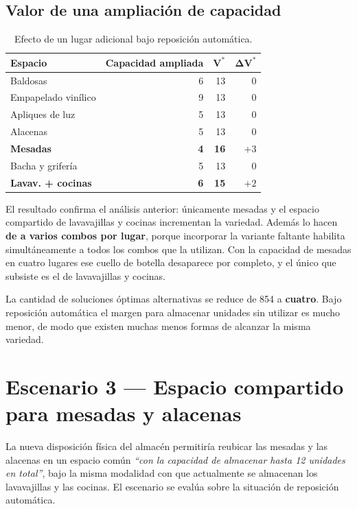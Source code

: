 \documentclass[10pt,a4paper]{article}
\newcommand{\cuello}[1]{\textbf{\textcolor{limita}{#1}}}
\newcommand{\cita}[1]{\emph{``#1''}}
\begin{document}
\subsection{Valor de una ampliación de capacidad}

\begin{table}[H]
\centering\small
\caption{Efecto de un lugar adicional bajo reposición automática.}
\label{tab:cap_e2}
\begin{tabular}{lrrr}
\toprule
\textbf{Espacio} & \textbf{Capacidad ampliada} & $\boldsymbol{V^{*}}$ & $\boldsymbol{\Delta V^{*}}$ \\
\midrule
Baldosas                  & 6 & 13 & 0 \\
Empapelado vinílico       & 9 & 13 & 0 \\
Apliques de luz           & 5 & 13 & 0 \\
Alacenas                  & 5 & 13 & 0 \\
\cuello{Mesadas}          & \cuello{4} & \cuello{16} & \cuello{$+3$} \\
Bacha y grifería          & 5 & 13 & 0 \\
\cuello{Lavav. + cocinas} & \cuello{6} & \cuello{15} & \cuello{$+2$} \\
\bottomrule
\end{tabular}
\end{table}

El resultado confirma el análisis anterior: únicamente mesadas y el espacio
compartido de lavavajillas y cocinas incrementan la variedad. Además lo hacen
\textbf{de a varios combos por lugar}, porque incorporar la variante faltante
habilita simultáneamente a todos los combos que la utilizan. Con la capacidad de
mesadas en cuatro lugares ese cuello de botella desaparece por completo, y el
único que subsiste es el de lavavajillas y cocinas.

La cantidad de soluciones óptimas alternativas se reduce de 854 a
\textbf{cuatro}. Bajo reposición automática el margen para almacenar unidades
sin utilizar es mucho menor, de modo que existen muchas menos formas de alcanzar
la misma variedad.

\section{Escenario 3 — Espacio compartido para mesadas y alacenas}
\label{sec:esc3}

La nueva disposición física del almacén permitiría reubicar las mesadas y las
alacenas en un espacio común \cita{con la capacidad de almacenar hasta 12
unidades en total}, bajo la misma modalidad con que actualmente se almacenan los
lavavajillas y las cocinas. El escenario se evalúa sobre la situación de
reposición automática.
\end{document}
